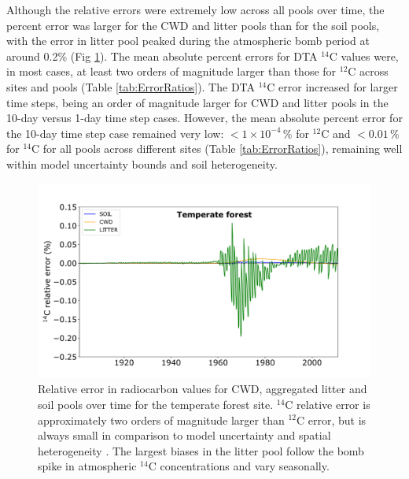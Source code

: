 \documentclass[11pt,a4paper]{article}
\begin{document}
Although the relative errors were extremely low across all pools over time, the percent error was larger for the CWD and litter pools than for the soil pools, with the error in litter pool peaked during the atmospheric bomb period at around 0.2\% (Fig \ref{fig:10dayErrorOverTime}). The mean absolute percent errors for DTA $^{14}$C values were, in most cases, at least two orders of magnitude larger than those for $^{12}$C across sites and pools (Table \ref{tab:ErrorRatios}). The DTA $^{14}$C error increased for larger time steps, being an order of magnitude larger for CWD and litter pools in the 10-day versus 1-day time step cases. However, the mean absolute percent error for the 10-day time step case remained very low: $< 1 \times 10^{-4}\,\%$ for $^{12}$C and $<0.01\,\%$ for $^{14}$C for all pools across different sites (Table \ref{tab:ErrorRatios}), remaining well within model uncertainty bounds and soil heterogeneity.

\begin{figure}[htbp]
        \centering 
        \includegraphics[width=1.0\linewidth]{figs/C14_through_time_rel_err_10_updatedLabel.png}
        \caption{Relative error in radiocarbon values for CWD, aggregated litter and soil pools over time for the temperate forest site. $^{14}$C relative error is approximately two orders of magnitude larger than $^{12}$C error, but is always small in comparison to model uncertainty and spatial heterogeneity \citep{Chen2009JGR}. The largest biases in the litter pool follow the bomb spike in atmospheric $^{14}$C concentrations and vary seasonally.}
        \label{fig:10dayErrorOverTime}
\end{figure}    
\end{document}
